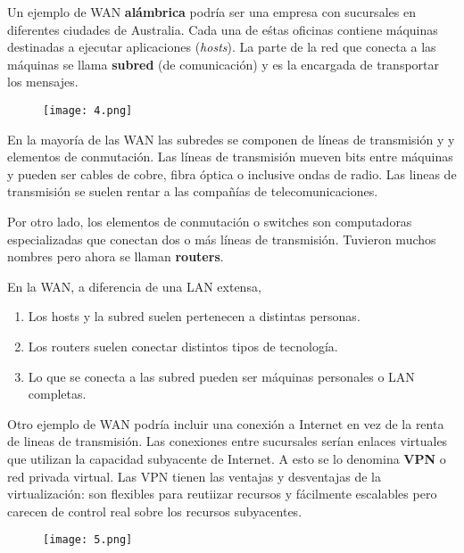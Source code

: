 \documentclass{book}
\begin{document}
	\vspace{3mm}
	Un ejemplo de WAN \textbf{alámbrica} podría ser una empresa con sucursales en diferentes ciudades de Australia. Cada una de eśtas oficinas contiene máquinas destinadas a ejecutar aplicaciones (\textit{hosts}). La parte de la red que conecta a las máquinas se llama \textbf{subred} (de comunicación) y es la encargada de transportar los mensajes.
	
	\begin{figure}[H]
		\centering
		\texttt{[image: 4.png]}
	\end{figure}
	
	En la mayoría de las WAN las subredes se componen de líneas de transmisión y y elementos de conmutación. Las líneas de transmisión mueven bits entre máquinas y pueden ser cables de cobre, fibra óptica o inclusive ondas de radio. Las lineas de transmisión se suelen rentar a las compañías de telecomunicaciones.
	
	\vspace{3mm}
	Por otro lado, los elementos de conmutación o switches son computadoras especializadas que conectan dos o más líneas de transmisión. Tuvieron muchos nombres pero ahora se llaman \textbf{routers}.
	
	\vspace{3mm}
	En la WAN, a diferencia de una LAN extensa,
	
	\begin{enumerate}
		\item Los hosts y la subred suelen pertenecen a distintas personas.
		\item Los routers suelen conectar distintos tipos de tecnología.
		\item Lo que se conecta a las subred pueden ser máquinas personales o LAN completas.
	\end{enumerate}
	
	Otro ejemplo de WAN podría incluir una conexión a Internet en vez de la renta de lineas de transmisión. Las conexiones entre sucursales serían enlaces virtuales que utilizan la capacidad subyacente de Internet. A esto se lo denomina \textbf{VPN} o red privada virtual. Las VPN tienen las ventajas y desventajas de la virtualización: son flexibles para reutiizar recursos y fácilmente escalables pero carecen de control real sobre los recursos subyacentes.
	
	\begin{figure}[H]
		\centering
		\texttt{[image: 5.png]}
	\end{figure}
	
\end{document}
